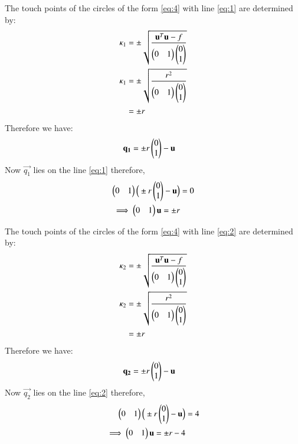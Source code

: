 \documentclass[journal,12pt,twocolumn]{IEEEtran}
\begin{document}
The touch points of the circles of the form \eqref{eq:4}  with line \eqref{eq:1} are determined by:
\begin{align}
\kappa_{1} &= \pm \sqrt{\frac{\mathbf{u}^T\mathbf{u}-f}{\begin{pmatrix}0 & 1 \end{pmatrix}\begin{pmatrix}0 \\ 1 \end{pmatrix}}} \\
\kappa_{1} &= \pm \sqrt{\frac{r^2}{\begin{pmatrix}0 & 1 \end{pmatrix}\begin{pmatrix}0 \\ 1 \end{pmatrix}}} \\
& =  \pm {r}
\end{align}
Therefore we have:
\begin{align}
\mathbf{q_{1}} &= \pm{r}\begin{pmatrix}0 \\ 1\end{pmatrix} - \mathbf{u}
\end{align}
Now $\vec{q_{1}}$ lies on the line \eqref{eq:1} therefore,
\begin{align}
\begin{pmatrix}0 & 1\end{pmatrix}\Big(\pm{r}\begin{pmatrix}0 \\ 1\end{pmatrix} - \mathbf{u}\Big) &= 0 \\
\implies \begin{pmatrix}0 & 1\end{pmatrix}\mathbf{u} = \pm{r}\label{eq:10}
\end{align}

The touch points of the circles of the form \eqref{eq:4}  with line \eqref{eq:2} are determined by:
\begin{align}
\kappa_{2} &= \pm \sqrt{\frac{\mathbf{u}^T\mathbf{u}-f}{\begin{pmatrix}0 & 1 \end{pmatrix}\begin{pmatrix}0 \\ 1 \end{pmatrix}}} \\
\kappa_{2} &= \pm \sqrt{\frac{r^2}{\begin{pmatrix}0 & 1 \end{pmatrix}\begin{pmatrix}0 \\ 1 \end{pmatrix}}} \\
& =  \pm {r}
\end{align}
Therefore we have:
\begin{align}
\mathbf{q_{2}} &= \pm{r}\begin{pmatrix}0 \\ 1\end{pmatrix} - \mathbf{u}
\end{align}
Now $\vec{q_{2}}$ lies on the line \eqref{eq:2} therefore,
\begin{align}
\begin{pmatrix}0 & 1\end{pmatrix}\Big(\pm{r}\begin{pmatrix}0 \\ 1\end{pmatrix} - \mathbf{u}\Big) &= 4 \\
\implies \begin{pmatrix}0 & 1\end{pmatrix}\mathbf{u} = \pm{r}-4\label{eq:11}
\end{align}
\end{document}
